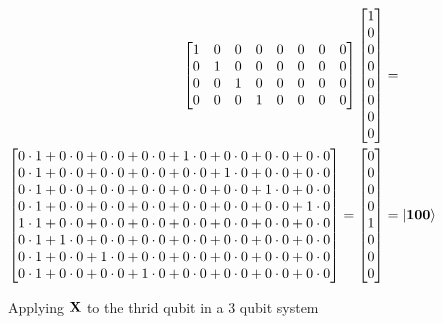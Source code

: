 \begin{figure}[H]
\begin{align*}
\begin{bmatrix}
            1 & 0 & 0 & 0 & 0 & 0 & 0 & 0\\
            0 & 1 & 0 & 0 & 0 & 0 & 0 & 0\\
            0 & 0 & 1 & 0 & 0 & 0 & 0 & 0\\
            0 & 0 & 0 & 1 & 0 & 0 & 0 & 0\\
        \end{bmatrix}
        \begin{bmatrix}
            1\\
            0\\
            0\\
            0\\
            0\\
            0\\
            0\\
            0
        \end{bmatrix}
        &=\\
        \begin{bmatrix}
            0\cdot 1 + 0\cdot 0 + 0\cdot 0 + 0\cdot 0 + 1\cdot 0 + 0\cdot 0 + 0\cdot 0 + 0\cdot 0\\
            0\cdot 1 + 0\cdot 0 + 0\cdot 0 + 0\cdot 0 + 0\cdot 0 + 1\cdot 0 + 0\cdot 0 + 0\cdot 0\\
            0\cdot 1 + 0\cdot 0 + 0\cdot 0 + 0\cdot 0 + 0\cdot 0 + 0\cdot 0 + 1\cdot 0 + 0\cdot 0\\
            0\cdot 1 + 0\cdot 0 + 0\cdot 0 + 0\cdot 0 + 0\cdot 0 + 0\cdot 0 + 0\cdot 0 + 1\cdot 0\\
            1\cdot 1 + 0\cdot 0 + 0\cdot 0 + 0\cdot 0 + 0\cdot 0 + 0\cdot 0 + 0\cdot 0 + 0\cdot 0\\
            0\cdot 1 + 1\cdot 0 + 0\cdot 0 + 0\cdot 0 + 0\cdot 0 + 0\cdot 0 + 0\cdot 0 + 0\cdot 0\\
            0\cdot 1 + 0\cdot 0 + 1\cdot 0 + 0\cdot 0 + 0\cdot 0 + 0\cdot 0 + 0\cdot 0 + 0\cdot 0\\
            0\cdot 1 + 0\cdot 0 + 0\cdot 0 + 1\cdot 0 + 0\cdot 0 + 0\cdot 0 + 0\cdot 0 + 0\cdot 0\\
        \end{bmatrix}
        =
        \begin{bmatrix}
            0\\
            0\\
            0\\
            0\\
            1\\
            0\\
            0\\
            0
        \end{bmatrix}
        &=
        \ket{\mathbf{1}\mathbf{0}\mathbf{0}}
    \end{align*}
    \caption{Applying $\mathbf{X}$ to the thrid qubit in a 3 qubit system}
    \label{fig:individual_application3}
\end{figure}
